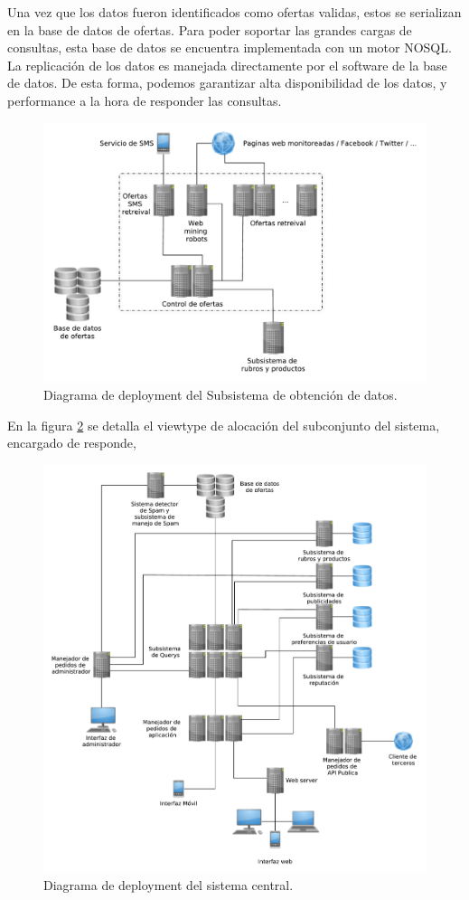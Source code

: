 Una vez que los datos fueron identificados como ofertas validas, estos se serializan en la base de datos de ofertas. Para poder soportar las grandes cargas de consultas, esta base de datos se encuentra implementada con un motor NOSQL. La replicación de los datos es manejada directamente por el software de la base de datos. De esta forma, podemos garantizar alta disponibilidad de los datos, y performance a la hora de responder las consultas.


\begin{figure}[H]
	\centering
	\includegraphics[width=\textwidth]{graficos/deploy/deploy_obtencion_datos.pdf}
	\caption{Diagrama de deployment del \textsf{Subsistema de obtención de datos}.}
	\label{fig:obtencion_datos}
\end{figure}

En la figura \ref{fig:deploy_query} se detalla el viewtype de alocación del subconjunto del sistema, encargado de responde, 


\begin{figure}[H]
	\centering
	\includegraphics[width=\textwidth]{graficos/deploy/deploy_cont.pdf}
	\caption{Diagrama de deployment del sistema central.}
	\label{fig:deploy_query}
\end{figure}



